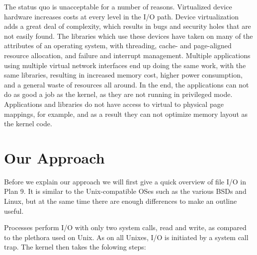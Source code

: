 \documentclass[letterpaper,twocolumn,10pt]{article}
\begin{document}
The status quo is unacceptable for a number of reasons. Virtualized device hardware increases costs at every level in the I/O path. Device
virtualization 
adds a great deal of complexity, which results in bugs and security holes that are not easily found. The libraries which use these 
devices have taken on many of the attributes of an operating system, with threading, cache- and page-aligned resource allocation, 
and failure and interrupt management. Multiple applications using multiple virtual network interfaces end up doing the same work, with the same
libraries, resulting in increased memory cost, higher power consumption, and a general waste of resources all around. In the end, the applications 
can not do as good a job as the kernel, as they are not running in privileged mode. Applications and libraries do not have access to
virtual to physical page mappings, for example, and as a result they can not optimize memory layout as the kernel code. 

\section{Our Approach}
Before we explain our approach we will first give a quick overview of file I/O in Plan 9. It is similar to the Unix-compatible OSes such as the various BSDs and Linux, 
but at the same time there are enough differences to make an outline useful. 

Processes perform I/O with only two system calls, read and write, as compared to the plethora used on Unix. As on all Unixes, I/O is initiated by a system call trap. 
The kernel then takes the folowing steps:
\end{document}
